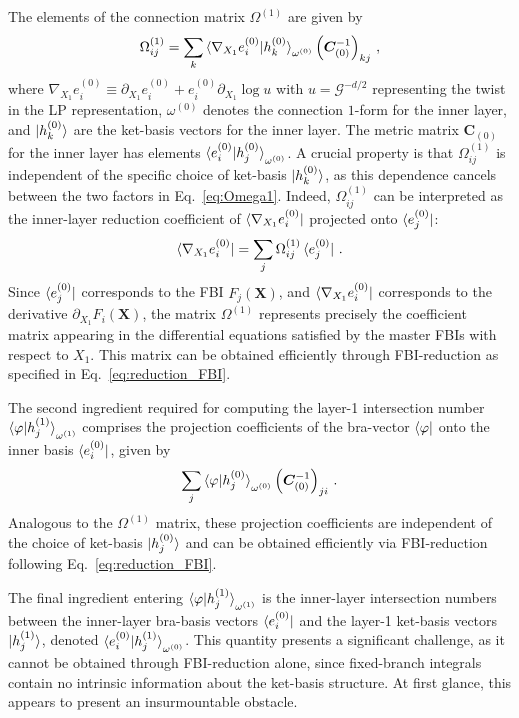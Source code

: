 \documentclass[reprint,superscriptaddress]{revtex4-2}
\newcommand{\w}{\omega}
\begin{document}
The elements of the connection matrix $\Omega^{(1)}$ are given by
\begin{equation}
    \Omega^{(1)}_{ij} = \sum_k \braket{\nabla_{X_1} e_i^{(0)} | h_k^{(0)}}_{\w^{(0)}}  \left( \bm{C}_{(0)}^{-1} \right)_{kj} \,,
    \label{eq:Omega1}
\end{equation}
where $\nabla_{X_1} e_i^{(0)} \equiv \partial_{X_1} e_i^{(0)} + e_i^{(0)} \partial_{X_1} \log u$ with $u=\mathcal{G}^{-d/2}$ representing the twist in the LP representation, $\omega^{(0)}$ denotes the connection $1$-form for the inner layer, and $\ket{h_k^{(0)}}$ are the ket-basis vectors for the inner layer. The metric matrix $\bm{C}_{(0)}$ for the inner layer has elements $\braket{e_i^{(0)} | h_j^{(0)}}_{\w^{(0)}}$. A crucial property is that $\Omega^{(1)}_{ij}$ is independent of the specific choice of ket-basis $\ket{h_k^{(0)}}$, as this dependence cancels between the two factors in Eq.~\eqref{eq:Omega1}. Indeed, $\Omega^{(1)}_{ij}$ can be interpreted as the inner-layer reduction coefficient of $\bra{\nabla_{X_1} e_i^{(0)}}$ projected onto $\bra{e_j^{(0)}}$:
\begin{equation}
    \bra{\nabla_{X_1} e_i^{(0)}} = \sum_j \Omega^{(1)}_{ij} \bra{e_j^{(0)}} \,.
\end{equation}
Since $\bra{e_j^{(0)}}$ corresponds to the FBI $F_j(\bm{X})$, and $\bra{\nabla_{X_1} e_i^{(0)}}$ corresponds to the derivative $\partial_{X_1} F_i(\bm{X})$, the matrix $\Omega^{(1)}$ represents precisely the coefficient matrix appearing in the differential equations satisfied by the master FBIs with respect to $X_1$. This matrix can be obtained efficiently through FBI-reduction as specified in Eq.~\eqref{eq:reduction_FBI}.

The second ingredient required for computing the layer-1 intersection number $\braket{\varphi | h_j^{(1)}}_{\w^{(1)}}$ comprises the projection coefficients of the bra-vector $\bra{\varphi}$ onto the inner basis $\bra{e_i^{(0)}}$, given by
\begin{equation}
    \sum_j \braket{\varphi | h_j^{(0)}}_{\w^{(0)}}  \left( \bm{C}_{(0)}^{-1} \right)_{ji} \,.
\end{equation}
Analogous to the $\Omega^{(1)}$ matrix, these projection coefficients are independent of the choice of ket-basis $\ket{h_j^{(0)}}$ and can be obtained efficiently via FBI-reduction following Eq.~\eqref{eq:reduction_FBI}.

The final ingredient entering $\braket{\varphi | h_j^{(1)}}_{\w^{(1)}}$ is the inner-layer intersection numbers between the inner-layer bra-basis vectors $\bra{e_i^{(0)}}$ and the layer-1 ket-basis vectors $\ket{h_j^{(1)}}$, denoted $\braket{e_i^{(0)} | h_j^{(1)}}_{\w^{(0)}}$. This quantity presents a significant challenge, as it cannot be obtained through FBI-reduction alone, since fixed-branch integrals contain no intrinsic information about the ket-basis structure. At first glance, this appears to present an insurmountable obstacle.
\end{document}
